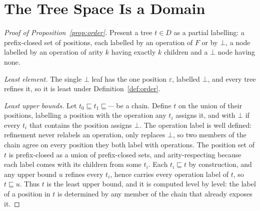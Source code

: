\appendix

\section{The Tree Space Is a Domain}\label{app:order}
\begin{proof}[Proof of Proposition~\ref{prop:order}]
  Present a tree $t \in D$ as a partial labelling: a prefix-closed set of positions, each
  labelled by an operation of $F$ or by $\bot$, a node labelled by an operation of arity $k$
  having exactly $k$ children and a $\bot$ node having none.

  \emph{Least element.} The single $\bot$ leaf has the one position $\varepsilon$, labelled
  $\bot$, and every tree refines it, so it is least under Definition~\ref{def:order}.

  \emph{Least upper bounds.} Let $t_0 \sqsubseteq t_1 \sqsubseteq \cdots$ be a chain. Define
  $t$ on the union of their positions, labelling a position with the operation any $t_i$
  assigns it, and with $\bot$ if every $t_i$ that contains the position assigns $\bot$. The
  operation label is well defined: refinement never relabels an operation, only replaces
  $\bot$, so two members of the chain agree on every position they both label with
  operations. The position set of $t$ is prefix-closed as a union of prefix-closed sets, and
  arity-respecting because each label comes with its children from some $t_i$. Each
  $t_i \sqsubseteq t$ by construction, and any upper bound $u$ refines every $t_i$, hence
  carries every operation label of $t$, so $t \sqsubseteq u$. Thus $t$ is the least upper
  bound, and it is computed level by level: the label of a position in $t$ is determined by
  any member of the chain that already exposes it.
\end{proof}

